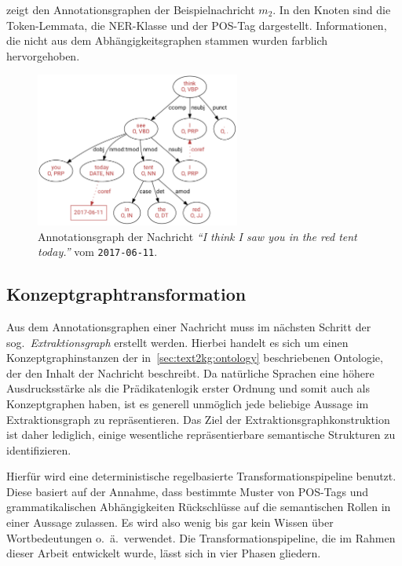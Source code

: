  zeigt den Annotationsgraphen der Beispielnachricht $m_2$.
In den Knoten sind die Token-Lemmata, die NER-Klasse und der POS-Tag dargestellt.
Informationen, die nicht aus dem Abhängigkeitsgraphen stammen wurden farblich hervorgehoben.
\begin{figure}[h]
	\centering
	\includegraphics[width=0.6\textwidth]{gfx/text2kg/annotationGraph1.pdf}
	\caption{Annotationsgraph der Nachricht \textit{``I think I saw you in the red tent today.''} vom \texttt{2017-06-11}.}\label{fig:text2kg:annotationGraph1} %
\end{figure}

\subsection{Konzeptgraphtransformation}%
\label{sec:text2kg:nlp:transform}

Aus dem Annotationsgraphen einer Nachricht muss im nächsten Schritt der sog.\ \textit{Extraktionsgraph} erstellt werden.
Hierbei handelt es sich um einen Konzeptgraphinstanzen der in~\ref{sec:text2kg:ontology} beschriebenen Ontologie, der den Inhalt der Nachricht beschreibt.
Da natürliche Sprachen eine höhere Ausdrucksstärke als die Prädikatenlogik erster Ordnung und somit auch als Konzeptgraphen haben, ist es generell unmöglich jede beliebige Aussage im Extraktionsgraph zu repräsentieren.
Das Ziel der Extraktionsgraphkonstruktion ist daher lediglich, einige wesentliche repräsentierbare semantische Strukturen zu identifizieren.

Hierfür wird eine deterministische regelbasierte Transformationspipeline benutzt.
Diese basiert auf der Annahme, dass bestimmte Muster von POS-Tags und grammatikalischen Abhängigkeiten Rückschlüsse auf die semantischen Rollen in einer Aussage zulassen.
Es wird also wenig bis gar kein Wissen über Wortbedeutungen o.~ä.\ verwendet.
Die Transformationspipeline, die im Rahmen dieser Arbeit entwickelt wurde, lässt sich in vier Phasen gliedern.


